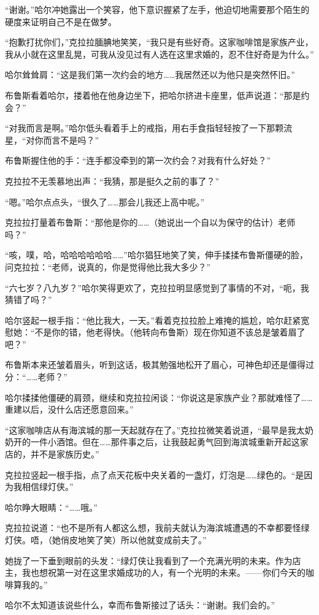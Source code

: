 \documentclass[../main]{subfiles}
\begin{document}
“谢谢。”哈尔冲她露出一个笑容，他下意识握紧了左手，他迫切地需要那个陌生的硬度来证明自己不是在做梦。

“抱歉打扰你们，”克拉拉腼腆地笑笑，“我只是有些好奇。这家咖啡馆是家族产业，我从小就在这里乱晃，可我从没见过有人选在这里求婚的，忍不住好奇是为什么。”

哈尔耸耸肩：“这是我们第一次约会的地方……我居然还以为他只是突然怀旧。”

布鲁斯看着哈尔，搂着他在他身边坐下，把哈尔挤进卡座里，低声说道：“那是约会？”

“对我而言是啊。”哈尔低头看着手上的戒指，用右手食指轻轻按了一下那颗流星，“对你而言不是吗？”

布鲁斯握住他的手：“连手都没牵到的第一次约会？对我有什么好处？”

克拉拉不无羡慕地出声：“我猜，那是挺久之前的事了？”

“嗯。”哈尔点点头，“很久了……那会儿我还上高中呢。”

克拉拉打量着布鲁斯：“那他是你的……（她说出一个自以为保守的估计）老师吗？”

“咳，噗，哈，哈哈哈哈哈哈……”哈尔猖狂地笑了笑，伸手揉揉布鲁斯僵硬的脸，问克拉拉：“老师，说真的，你是觉得他比我大多少？”

“六七岁？八九岁？”哈尔笑得更欢了，克拉拉明显感觉到了事情的不对，“呃，我猜错了吗？”

哈尔竖起一根手指：“他比我大，一天。”看着克拉拉脸上难掩的尴尬，哈尔赶紧宽慰她：“不是你的错，他老得快。（他转向布鲁斯）现在你知道不该总是皱着眉了吧？”

布鲁斯本来还皱着眉头，听到这话，极其勉强地松开了眉心，可神色却还是僵得过分：“……老师？”

哈尔揉揉他僵硬的肩颈，继续和克拉拉闲谈：“你说这是家族产业？那就难怪了……重建以后，没什么店还愿意回来。”

“这家咖啡店从有海滨城的那一天起就存在了。”克拉拉微笑着说道，“最早是我太奶奶开的一件小酒馆。但在……那件事之后，让我鼓起勇气回到海滨城重新开起这家店的，并不是家族历史。”

克拉拉竖起一根手指，点了点天花板中央关着的一盏灯，灯泡是……绿色的。“是因为我相信绿灯侠。”

哈尔睁大眼睛：“……哦。”

克拉拉说道：“也不是所有人都这么想，我前夫就认为海滨城遭遇的不幸都要怪绿灯侠。唔，（她俏皮地笑了笑）所以他就变成前夫了。”

她拢了一下垂到眼前的头发：“绿灯侠让我看到了一个充满光明的未来。作为店主，我也想祝第一对在这里求婚成功的人，有一个光明的未来。——你们今天的咖啡算我的。”

哈尔不太知道该说些什么，幸而布鲁斯接过了话头：“谢谢。我们会的。”
\end{document}

